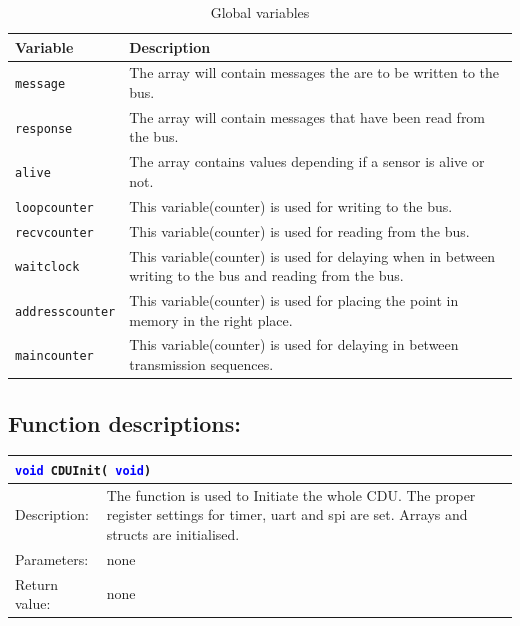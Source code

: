 \begin{table}[H]
\begin{tabular}{|l|p{10cm}|}
\hline
\cellcolor[gray]{0.8}\textbf{Variable} &\cellcolor[gray]{0.8} \textbf{Description}\\ \hline
\texttt{message} & The array will contain messages the are to be written to the bus.\\ 
\hline
\texttt{response} & The array will contain messages that have been read from the bus.\\ 
\hline
\texttt{alive} & The array contains values depending if a sensor is alive or not.\\ 
\hline
\texttt{loopcounter} & This variable(counter) is used for writing to the bus.\\ 
\hline
\texttt{recvcounter} & This variable(counter) is used for reading from the bus.\\ 
\hline
\texttt{waitclock} & This variable(counter) is used for delaying when in between writing to the bus and reading from the bus.\\ 
\hline
\texttt{addresscounter} & This variable(counter) is used for placing the point in memory in the right place.\\ 
\hline
\texttt{maincounter} & This variable(counter) is used for delaying in between transmission sequences.\\ 
\hline
\end{tabular}
\label{tab:globalvar}
\caption{Global variables}
\end{table}


\subsection{Function descriptions:}

\begin{table}[H]
\begin{tabular}{l p{12.5cm}}
\multicolumn{2}{l}{\texttt{\textcolor{blue}{void} CDUInit( \texttt{\textcolor{blue}{void}})}} \\
\hline
Description:& The function is used to Initiate the whole CDU. The proper register settings for timer, uart and spi are set. Arrays and structs are initialised.\\
Parameters:&none\\
Return value:&none\\
\end{tabular}
\end{table}


